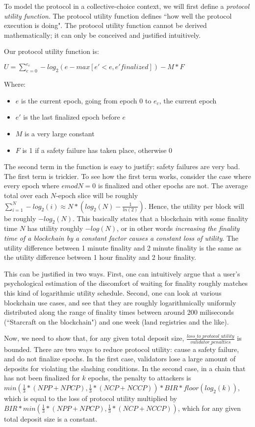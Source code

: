 \documentclass[12pt]{article}
\begin{document}
To model the protocol in a collective-choice context, we will first define a \textit{protocol utility function}. The protocol utility function defines ``how well the protocol execution is doing". The protocol utility function cannot be derived mathematically; it can only be conceived and justified intuitively.

Our protocol utility function is:

$U = \sum_{e = 0}^{e_c} -log_2(e - max[e\prime < e, e\prime finalized]) - M * F$

Where:

\begin{itemize}
\item $e$ is the current epoch, going from epoch $0$ to $e_c$, the current epoch
\item $e\prime$ is the last finalized epoch before $e$
\item $M$ is a very large constant
\item $F$ is 1 if a safety failure has taken place, otherwise 0
\end{itemize}

The second term in the function is easy to justify: safety failures are very bad. The first term is trickier. To see how the first term works, consider the case where every epoch where $e mod N = 0$ is finalized and other epochs are not. The average total over each $N$-epoch slice will be roughly $\sum_{i=1}^N -log_2(i) \approx N * (log_2(N) - \frac{1}{ln(2)})$. Hence, the utility per block will be roughly $-log_2(N)$. This basically states that a blockchain with some finality time $N$ has utility roughly $-log(N)$, or in other words \textit{increasing the finality time of a blockchain by a constant factor causes a constant loss of utility}. The utility difference between 1 minute finality and 2 minute finality is the same as the utility difference between 1 hour finality and 2 hour finality.

This can be justified in two ways. First, one can intuitively argue that a user's psychological estimation of the discomfort of waiting for finality roughly matches this kind of logarithmic utility schedule. Second, one can look at various blockchain use cases, and see that they are roughly logarithmically uniformly distributed along the range of finality times between around 200 miliseconds (``Starcraft on the blockchain") and one week (land registries and the like).

Now, we need to show that, for any given total deposit size, $\frac{loss\_to\_protocol\_utility}{validator\_penalties}$ is bounded. There are two ways to reduce protocol utility: cause a safety failure, and do not finalize epochs. In the first case, validators lose a large amount of deposits for violating the slashing conditions. In the second case, in a chain that has not been finalized for $k$ epochs, the penalty to attackers is $min(\frac{1}{3} * (NPP + NPCP), \frac{1}{3} * (NCP + NCCP)) * BIR * floor(log_2(k))$, which is equal to the loss of protocol utility multiplied by $BIR * min(\frac{1}{3} * (NPP + NPCP), \frac{1}{3} * (NCP + NCCP))$, which for any given total deposit size is a constant.
\end{document}
